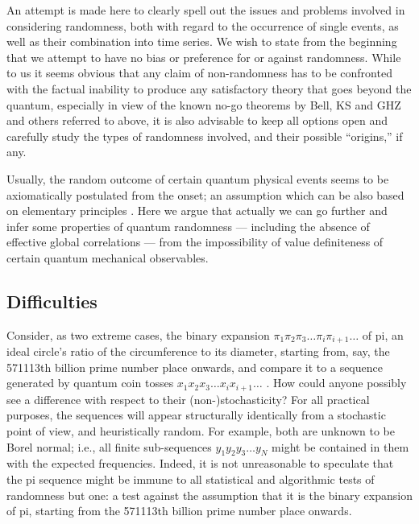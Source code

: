 \documentclass[pra,amsfonts,preprint,showkeys]{revtex4}
\begin{document}
An attempt is made here to clearly spell out the issues and problems involved in
considering randomness, both with regard to the occurrence of single events,
as well as their combination into time series.
We wish to state from the beginning that we attempt to have no bias or
preference for or against randomness. While to us  it seems obvious that
any claim of non-randomness has to be confronted with the factual inability
to produce any satisfactory theory that goes beyond the quantum,
especially in view of the known no-go theorems by Bell, KS and GHZ  and others
referred to above,
it is also advisable to  keep all options open and carefully study
the types of randomness involved, and their possible ``origins,'' if any.




Usually,  the random outcome of certain quantum physical events
seems to be axiomatically postulated
from the onset; an assumption which
can be also based on elementary principles \cite{zeil-99,zeil-bruk-02}.
Here we argue that actually we can go further and
infer some properties of quantum randomness --- including the absence of effective global correlations ---
from the impossibility of value definiteness of certain quantum mechanical observables.


\subsection{Difficulties}%

Consider, as two extreme cases,
the binary expansion $\pi_1\pi_2\pi_3\ldots \pi_i \pi_{i+1}  \ldots$ of pi, an ideal circle's ratio of the circumference to its diameter,
starting from, say, the 571113th billion prime number place onwards,
and compare it to a sequence generated by quantum coin tosses
$x_1x_2x_3\ldots x_i x_{i+1}  \ldots$
\cite{svozil-qct,zeilinger:qct,Cris04}.
How could anyone possibly see a difference with respect to their (non-)stochasticity?
For all practical purposes, the sequences will appear structurally identically
from a stochastic point of view,
and heuristically random. For example, both are unknown to be Borel normal; i.e.,
all finite sub-sequences $y_1y_2y_3\ldots y_N$
might be contained in them with the expected frequencies.
Indeed, it is not unreasonable to speculate that the pi sequence
might be immune to all statistical and algorithmic
tests of randomness but one:
a test against the assumption that it is the binary expansion of pi, starting from the 571113th billion prime number place onwards.
\end{document}
